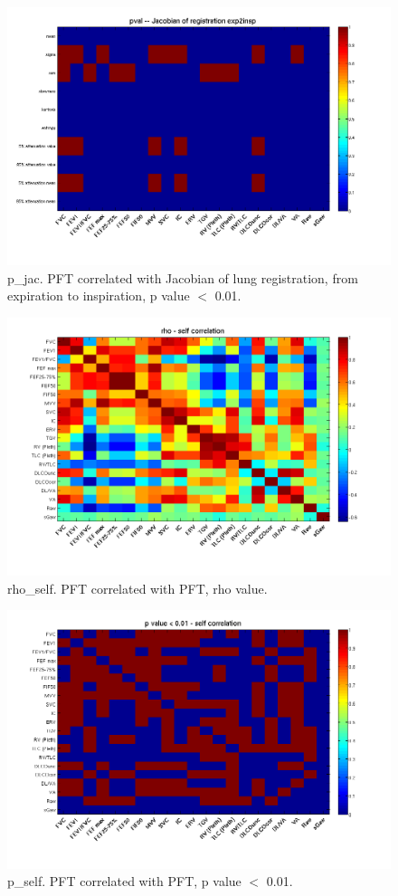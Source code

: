 \documentclass[12pt]{article}
\begin{document}
\begin{figure}
 \includegraphics[width=0.9\linewidth,viewport=100 60 620 520]{p_jac.png}
 \caption{p\_jac. PFT correlated with Jacobian of lung registration, from expiration to inspiration, p value $<$ 0.01.}
\end{figure}

\begin{figure}
 \includegraphics[width=0.9\linewidth,viewport=100 60 620 520]{rho_self.png}
 \caption{rho\_self. PFT correlated with PFT, rho value.}
\end{figure}

\begin{figure}
 \includegraphics[width=0.9\linewidth,viewport=100 60 620 520]{p_self.png}
 \caption{p\_self. PFT correlated with PFT, p value $<$ 0.01.}
\end{figure}
\end{document}

